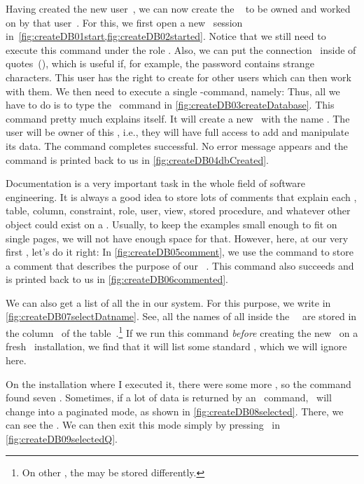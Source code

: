 %
%
%
%
Having created the new user~, we can now create the \db\  to be owned and worked on by that user~.
For this, we first open a new \psql\ session in~\cref{fig:createDB01start,fig:createDB02started}.
Notice that we still need to execute this command under the  role .
Also, we can put the connection~ inside of quotes~(), which is useful if, for example, the password contains strange characters.
This user has the right to create  for other users which can then work with them.
We then need to execute a single \sql-command, namely:
%
%
%
Thus, all we have to do is to type the \sql\ command  in \cref{fig:createDB03createDatabase}.
This command pretty much explains itself.
It will create a new \db\ with the name .
The user  will be owner of this \db, i.e., they will have full access to add and manipulate its data.
The command completes successful.
No error message appears and the command is printed back to us in \cref{fig:createDB04dbCreated}.

Documentation is a very important task in the whole field of software engineering.
It is always a good idea to store lots of comments that explain each \db, table, column, constraint, role, user, view, stored procedure, and whatever other object could exist on a \dbms.
Usually, to keep the examples small enough to fit on single pages, we will not have enough space for that.
However, here, at our very first \db, let's do it right:
In \cref{fig:createDB05comment}, we use the  command to store a comment that describes the purpose of our \db\ .
This command also succeeds and is printed back to us in \cref{fig:createDB06commented}.%
%
\begin{sloppypar}%
We can also get a list of all the  in our system.
For this purpose, we write  in \cref{fig:createDB07selectDatname}.
See, all the names of all  inside the \postgresql\ \dbms\ are stored in the column~ of the table~.\footnote{%
On other , the  may be stored differently.}
If we run this command \emph{before} creating the new \db\ on a fresh \postgresql\ installation, we find that it will list some standard , which we will ignore here.%
\end{sloppypar}%
%
On the installation where I executed it, there were some more , so the command found seven .
Sometimes, if a lot of data is returned by an \sql\ command, \psql\ will change into a paginated mode, as shown in \cref{fig:createDB08selected}.
There, we can see the .
We can then exit this mode simply by pressing~ in \cref{fig:createDB09selectedQ}.


